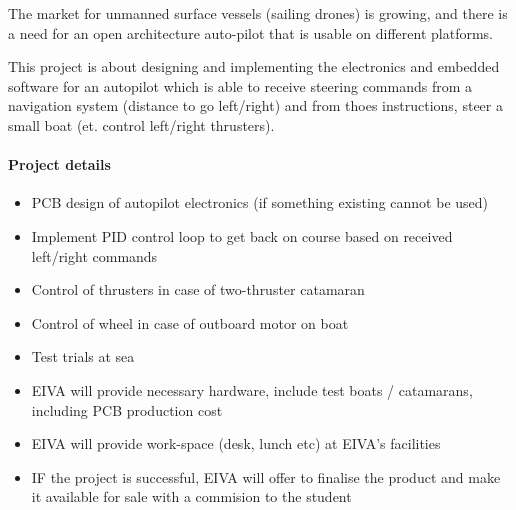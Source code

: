The market for unmanned surface vessels (sailing drones) is growing, and there is a need for an open architecture auto-pilot that is usable on different platforms.

This project is about designing and implementing the electronics and embedded software for an autopilot which is able to receive steering commands from a navigation system (distance to go left/right) and from thoes instructions, steer a small boat (et. control left/right thrusters).

\paragraph{Project details}
\begin{itemize}
\item PCB design of autopilot electronics (if something existing cannot be used)
\item Implement PID control loop to get back on course based on received left/right commands
\item Control of thrusters in case of two-thruster catamaran
\item Control of wheel in case of outboard motor on boat
\item Test trials at sea
\item EIVA will provide necessary hardware, include test boats / catamarans, including PCB production cost
\item EIVA will provide work-space (desk, lunch etc) at EIVA's facilities
\item IF the project is successful, EIVA will offer to finalise the product and make it available for sale with a commision to the student
\end{itemize}

